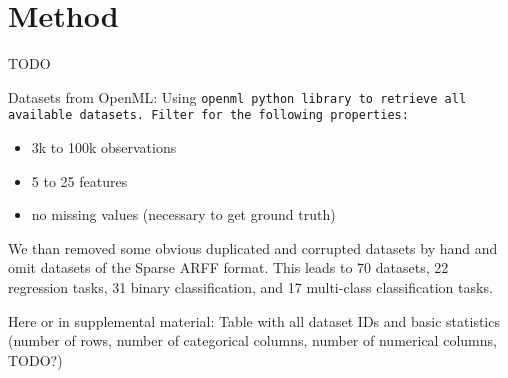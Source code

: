 

\section{Method}

TODO



Datasets from OpenML:
Using \tt{openml} python library to retrieve all available datasets. Filter for the following properties:
\begin{itemize}
	\item 3k to 100k observations
	\item 5 to 25 features
	\item no missing values (necessary to get ground truth)
\end{itemize}

We than removed some obvious duplicated and corrupted datasets by hand and omit datasets of the Sparse ARFF format. This leads to 70 datasets, 22 regression tasks, 31 binary classification, and 17 multi-class classification tasks.

Here or in supplemental material: Table with all dataset IDs and basic statistics (number of rows, number of categorical columns, number of numerical columns, TODO?)
